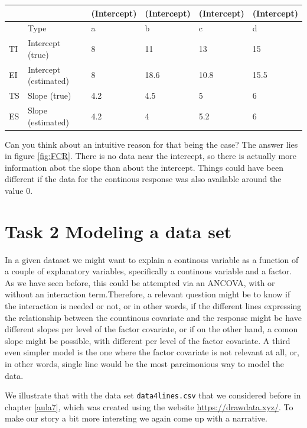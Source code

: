 \documentclass[
]{book}
\begin{document}
\begin{tabular}{l|l|l|l|l|l}
\hline
  &  & (Intercept) & (Intercept) & (Intercept) & (Intercept)\\
\hline
 & Type & a & b & c & d\\
\hline
TI & Intercept (true) & 8 & 11 & 13 & 15\\
\hline
EI & Intercept (estimated) & 8 & 18.6 & 10.8 & 15.5\\
\hline
TS & Slope (true) & 4.2 & 4.5 & 5 & 6\\
\hline
ES & Slope (estimated) & 4.2 & 4 & 5.2 & 6\\
\hline
\end{tabular}

Can you think about an intuitive reason for that being the case? The answer lies in figure \ref{fig:FCR}. There is no data near the intercept, so there is actually more information abot the slope than about the intercept. Things could have been different if the data for the continous response was also available around the value 0.

\hypertarget{task-2-modeling-a-data-set}{%
\section{Task 2 Modeling a data set}\label{task-2-modeling-a-data-set}}

In a given dataset we might want to explain a continous variable as a function of a couple of explanatory variables, specifically a continous variable and a factor. As we have seen before, this could be attempted via an ANCOVA, with or without an interaction term.Therefore, a relevant question might be to know if the interaction is needed or not, or in other words, if the different lines expressing the relationship between the countinous covariate and the response might be have different slopes per level of the factor covariate, or if on the other hand, a comon slope might be possible, with different per level of the factor covariate. A third even simpler model is the one where the factor covariate is not relevant at all, or, in other words, single line would be the most parcimonious way to model the data.

We illustrate that with the data set \texttt{data4lines.csv} that we considered before in chapter \ref{aula7}, which was created using the website \url{https://drawdata.xyz/}. To make our story a bit more intersting we again come up with a narrative.
\end{document}
